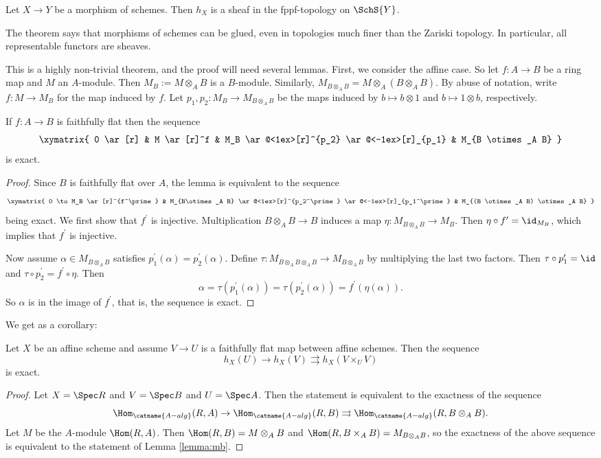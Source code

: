 \documentclass[11pt, english]{article}
\begin{document}
\begin{thm}
\label{thm:hxsheaf}
Let $X \to Y$ be a morphism of schemes. Then $h_X$ is a sheaf in the fppf-topology on $\SchS{Y}$.
\label{thm:fppf}
\end{thm}

The theorem says that morphisms of schemes can be glued, even in topologies much finer than the Zariski topology. In particular, all representable functors are sheaves.

This is a highly non-trivial theorem, and the proof will need several lemmas. First, we consider the affine case. So let $f:A \to B$ be a ring map and $M$ an $A$-module. Then $M_B := M \otimes_A B$ is a $B$-module. Similarly, $M_{B \otimes _AB} = M \otimes_A (B \otimes _A B)$. By abuse of notation, write $f:M \to M_B$ for the map induced by $f$. Let $p_1,p_2:M_B \to M_{B \otimes_A B}$ be the maps induced by $b \mapsto b \otimes 1$ and $b \mapsto 1 \otimes b$, respectively.

\begin{lemma}
\label{lemma:mb}
If $f:A \to B$ is faithfully flat then the sequence
\[
\xymatrix{
0 \ar[r] & M \ar[r]^f & M_B \ar@<1ex>[r]^{p_2} \ar@<-1ex>[r]_{p_1} & M_{B \otimes_A B}
}
\]
is exact.
\end{lemma}

\begin{proof}
Since $B$ is faithfully flat over $A$, the lemma is equivalent to the sequence
\[
\xymatrix{
0 \to M_B \ar[r]^{f^\prime} & M_{B\otimes_A B} \ar@<1ex>[r]^{p_2^\prime } \ar@<-1ex>[r]_{p_1^\prime } & M_{(B \otimes_A B) \otimes_A B}
}
\]
being exact. We first show that $f^\prime$ is injective. Multiplication $B \otimes_A B \to B$ induces a map $\eta: M_{B \otimes_A B} \to M_B$. Then $\eta \circ f^\prime = \id_{M_B}$, which implies that $f^\prime$ is injective.

Now assume $\alpha \in M_{B \otimes_A B}$ satisfies $p_1^\prime(\alpha)=p_2^\prime(\alpha)$. Define $\tau:M_{B \otimes_A B \otimes_A B} \to M_{B \otimes_A B}$ by multiplying the last two factors. Then $\tau \circ p_1^\prime = \id$ and $\tau \circ p_2 ^\prime = f^\prime \circ \eta$. Then 
\[
\alpha = \tau(p_1^\prime(\alpha)) = \tau(p_2^\prime(\alpha)) = f^\prime(\eta(\alpha)).
\]
So $\alpha$ is in the image of $f^\prime$, that is, the sequence is exact.
\end{proof}

We get as a corollary:
\begin{corr}
\label{corr:affineexact}
Let $X$ be an affine scheme and assume $V \to U$ is a faithfully flat map between affine schemes. Then the sequence
\[
h_X(U) \to  h_X(V)\rightrightarrows  h_X(V \times_U V) 
\]
is exact.
\end{corr}
\begin{proof}
Let $X = \Spec R$ and $V = \Spec B$ and $U = \Spec A$. Then the statement is equivalent to the exactness of the sequence
\[
\Hom_{\catname{A-alg}}(R,A) \to \Hom_{\catname{A-alg}}(R,B) \rightrightarrows \Hom_{\catname{A-alg}}(R, B \otimes_A B).
\]
Let $M$ be the $A$-module $\Hom(R,A)$. Then $\Hom(R,B) = M \otimes_A B$ and $\Hom(R,B \times_A B) = M_{B \otimes_A B}$, so the exactness of the above sequence is equivalent to the statement of Lemma \ref{lemma:mb}.
\end{proof}
\end{document}
